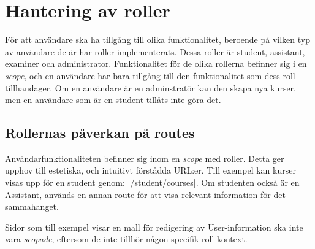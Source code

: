 \section{Hantering av roller}

För att användare ska ha tillgång till olika funktionalitet, beroende på vilken typ av användare de är har roller implementerats. Dessa roller är student, assistant, examiner och administrator. Funktionalitet för de olika rollerna befinner sig i en \emph{scope}, och en användare har bara tillgång till den funktionalitet som dess roll tillhandager. Om en användare är en adminstratör kan den skapa nya kurser, men en användare som är en student tillåts inte göra det.

\subsection{Rollernas påverkan på routes}
Användarfunktionaliteten befinner sig inom en \emph{scope} med roller. Detta ger upphov till estetiska, och intuitivt förstådda URL:er. Till exempel kan kurser visas upp för en student genom: |/student/courses|. Om studenten också är en Assistant, används en annan route för att visa relevant information för det sammahanget.

Sidor som till exempel visar en mall för redigering av User-information ska inte vara \emph{scopade}, eftersom de inte tillhör någon specifik roll-kontext.
